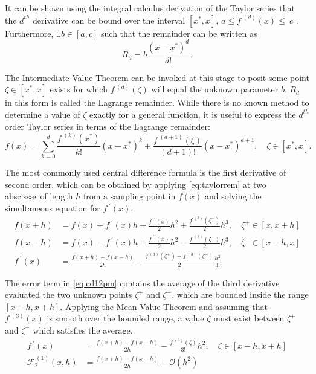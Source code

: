 It can be shown using the integral calculus derivation of the Taylor series that the $d^{th}$ derivative can be bound over the interval $[x^*, x]$, \ie $a\leq f^{\;(d)}(x) \leq~c$ \cite{Greenberg1978}.
Furthermore, $\exists b \in [a,c]$ such that the remainder can be written as
\begin{equation}
   R_d = b \frac{(x-x^*)^d}{d!}.
\end{equation}

The Intermediate Value Theorem can be invoked at this stage to posit some point $\zeta \in [x^*,x]$ exists for which $f^{\;(d)}(\zeta)$ will equal the unknown parameter $b$.
$R_d$ in this form is called the Lagrange remainder.
While there is no known method to determine a value of $\zeta$ exactly for a general function, it is useful to express the $d^{th}$ order Taylor series in terms of the Lagrange remainder:
\begin{equation}
    f(x) = \sum_{k=0}^d \frac{f^{\;(k)}(x^*)}{k!}(x-x^*)^k + \frac{f^{\;(d+1)}(\zeta)}{(d+1)!}(x-x^*)^{d+1}, \quad \zeta \in [x^*,x].\label{eq:taylorrem}
\end{equation}

The most commonly used central difference formula is the first derivative of second order, which can be obtained by applying \cref{eq:taylorrem} at two absciss\ae\ of length $h$ from a sampling point in $f(x)$ and solving the simultaneous equation for $f^{\;\prime}(x)$.
\begin{align}
f(x+h) &= f(x) + f^{\;\prime}(x)h + \frac{f^{\;\prime\prime}(x)}{2}h^2 + \frac{f^{\;(3)}(\zeta^+)}{2}h^3, \quad \zeta^+ \in [x,x+h] \\
f(x-h) &= f(x) - f^{\;\prime}(x)h + \frac{f^{\;\prime\prime}(x)}{2}h^2 - \frac{f^{\;(3)}(\zeta^-)}{2}h^3, \quad \zeta^- \in [x-h,x] \\
f^{\;\prime}(x) &= \frac{f(x+h)-f(x-h)}{2h} - \frac{f^{\;(3)}(\zeta^+)+f^{\;(3)}(\zeta^-)}{2}\frac{h^2}{3!}\label{eq:cd12pm}
\end{align}

The error term in \cref{eq:cd12pm} contains the average of the third derivative evaluated the two unknown points $\zeta^+$ and $\zeta^-$, which are bounded inside the range $[x-h,x+h]$.
Applying the Mean Value Theorem and assuming that $f^{\;(3)}(x)$ is smooth over the bounded range, a value $\zeta$ must exist between $\zeta^+$ and $\zeta^-$ which satisfies the average.
\begin{align}
f^{\;\prime}(x) &= \frac{f(x+h)-f(x-h)}{2h} - \frac{f^{\;(3)}(\zeta)}{3!}h^2, \quad \zeta \in [x-h,x+h]\label{eq:cd12t} \\
\mathcal{F}_2^{\,(1)}(x,h) &= \frac{f(x+h)-f(x-h)}{2h} + \mathcal{O}(h^2)\label{eq:cd12f}
\end{align}

